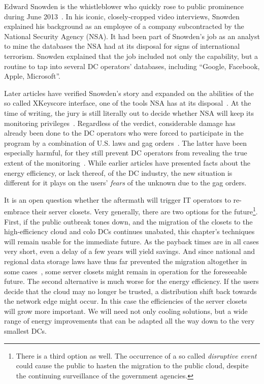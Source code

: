 \documentclass[officiallayout]{tktla}
\begin{document}
Edward Snowden is the whistleblower who quickly rose to public prominence
during June 2013~\cite{Greenwald2013,Gellman2013}. In his iconic,
closely-cropped video interviews, Snowden explained his background as an
employee of a company subcontracted by the National Security Agency (NSA). It
had been part of Snowden's job as an analyst to mine the databases the NSA had
at its disposal for signs of international terrorism.  Snowden explained that
the job included not only the capability, but a routine to tap into several
DC operators' databases, including ``Google, Facebook, Apple, Microsoft''.

Later articles have verified Snowden's story and expanded on the abilities of
the so called XKeyscore interface, one of the tools NSA has at its
disposal~\cite{Greenwald2013a}. At the time of writing, the jury is still
literally out to decide whether NSA will keep its monitoring
privileges~\cite{Sirer2013}. Regardless of the verdict, considerable damage
has already been done to the DC operators who were forced to participate in
the program by a combination of U.S. laws and gag orders~\cite{Gallagher2013}.
The latter have been especially harmful, for they still prevent DC operators
from revealing the true extent of the monitoring~\cite{Drummond2013}. While
earlier articles have presented facts about the energy efficiency, or lack
thereof, of the DC industry, the new situation is different for it plays on
the users' \emph{fears} of the unknown due to the gag orders.

It is an open question whether the aftermath will trigger IT operators to
re-embrace their server closets.  Very generally, there are two options for
the future\footnote{There is a third option as well. The occurrence of a so
called \emph{disruptive event} could cause the public to hasten the migration
to the public cloud, despite the continuing surveillance of the government
agencies.}. First, if the public outbreak tones down, and the migration of the
closets to the high-efficiency cloud and colo DCs continues unabated, this
chapter's techniques will remain usable for the immediate future. As the
payback times are in all cases very short, even a delay of a few years will
yield savings. And since national and regional data storage laws have thus far
prevented the migration altogether in some
cases~\cite{Bailey2006,Gallagher2013}, some server closets might remain in
operation for the foreseeable future. The second alternative is much worse for
the energy efficiency. If the users decide that the cloud may no longer be
trusted, a distribution shift back towards the network edge might occur. In
this case the efficiencies of the server closets will grow more important. We
will need not only cooling solutions, but a wide range of energy improvements
that can be adapted all the way down to the very smallest DCs.
\end{document}
